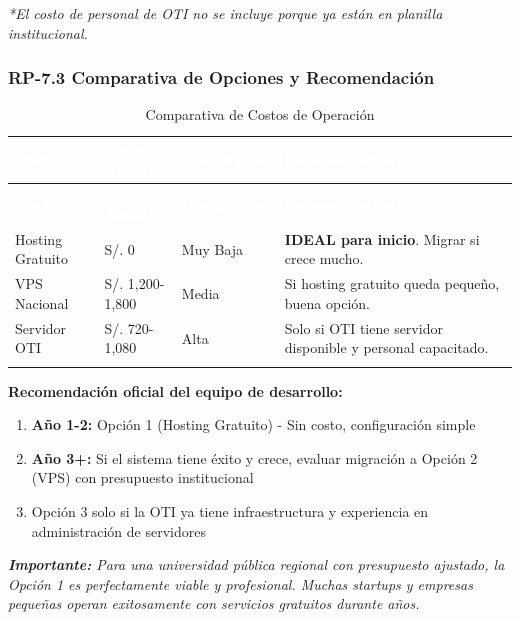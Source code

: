 \documentclass[12pt,a4paper]{article}
\begin{document}
\textit{*El costo de personal de OTI no se incluye porque ya están en planilla institucional.}

\subsubsection{RP-7.3 Comparativa de Opciones y Recomendación}

\begin{longtable}{|>{\raggedright\arraybackslash}p{3.5cm}|>{\centering\arraybackslash}p{2cm}|>{\centering\arraybackslash}p{2.5cm}|>{\raggedright\arraybackslash}p{6cm}|}
\hline
\rowcolor{headerblue}
\textcolor{white}{\textbf{Opción}} & \textcolor{white}{\textbf{Costo Anual}} & \textcolor{white}{\textbf{Complejidad}} & \textcolor{white}{\textbf{Recomendación}} \\
\hline
\endfirsthead
\hline
\rowcolor{headerblue}
\textcolor{white}{\textbf{Opción}} & \textcolor{white}{\textbf{Costo Anual}} & \textcolor{white}{\textbf{Complejidad}} & \textcolor{white}{\textbf{Recomendación}} \\
\hline
\endhead
\hline
\endlastfoot

Hosting Gratuito & S/. 0 & Muy Baja & \textbf{IDEAL para inicio}. Migrar si crece mucho. \\
\hline
\rowcolor{rowgray}
VPS Nacional & S/. 1,200-1,800 & Media & Si hosting gratuito queda pequeño, buena opción. \\
\hline
Servidor OTI & S/. 720-1,080 & Alta & Solo si OTI tiene servidor disponible y personal capacitado. \\
\hline
\caption{Comparativa de Costos de Operación}
\end{longtable}

\textbf{Recomendación oficial del equipo de desarrollo:}
\begin{enumerate}[noitemsep]
    \item \textbf{Año 1-2:} Opción 1 (Hosting Gratuito) - Sin costo, configuración simple
    \item \textbf{Año 3+:} Si el sistema tiene éxito y crece, evaluar migración a Opción 2 (VPS) con presupuesto institucional
    \item Opción 3 solo si la OTI ya tiene infraestructura y experiencia en administración de servidores
\end{enumerate}

\textit{\textbf{Importante:} Para una universidad pública regional con presupuesto ajustado, la Opción 1 es perfectamente viable y profesional. Muchas startups y empresas pequeñas operan exitosamente con servicios gratuitos durante años.}
\end{document}
